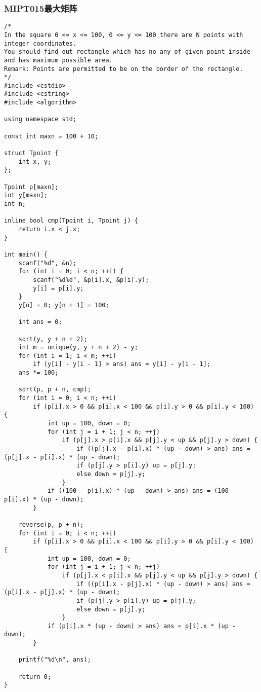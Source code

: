 \subsubsection{MIPT015最大矩阵}
\begin{verbatim}
/*
In the square 0 <= x <= 100, 0 <= y <= 100 there are N points with integer coordinates.
You should find out rectangle which has no any of given point inside and has maximum possible area.
Remark: Points are permitted to be on the border of the rectangle.
*/
#include <cstdio>
#include <cstring>
#include <algorithm>

using namespace std;

const int maxn = 100 + 10;

struct Tpoint {
	int x, y;
};

Tpoint p[maxn];
int y[maxn];
int n;

inline bool cmp(Tpoint i, Tpoint j) {
	return i.x < j.x;
}

int main() {
	scanf("%d", &n);
	for (int i = 0; i < n; ++i) {
		scanf("%d%d", &p[i].x, &p[i].y);
		y[i] = p[i].y;
	}
	y[n] = 0; y[n + 1] = 100;

	int ans = 0;

	sort(y, y + n + 2);
	int m = unique(y, y + n + 2) - y;
	for (int i = 1; i < m; ++i)
		if (y[i] - y[i - 1] > ans) ans = y[i] - y[i - 1];
	ans *= 100;

	sort(p, p + n, cmp);
	for (int i = 0; i < n; ++i)
		if (p[i].x > 0 && p[i].x < 100 && p[i].y > 0 && p[i].y < 100) {
			int up = 100, down = 0;
			for (int j = i + 1; j < n; ++j)
				if (p[j].x > p[i].x && p[j].y < up && p[j].y > down) {
					if ((p[j].x - p[i].x) * (up - down) > ans) ans = (p[j].x - p[i].x) * (up - down);
					if (p[j].y > p[i].y) up = p[j].y;
					else down = p[j].y;
				}
			if ((100 - p[i].x) * (up - down) > ans) ans = (100 - p[i].x) * (up - down);
		}

	reverse(p, p + n);
	for (int i = 0; i < n; ++i)
		if (p[i].x > 0 && p[i].x < 100 && p[i].y > 0 && p[i].y < 100) {
			int up = 100, down = 0;
			for (int j = i + 1; j < n; ++j)
				if (p[j].x < p[i].x && p[j].y < up && p[j].y > down) {
					if ((p[i].x - p[j].x) * (up - down) > ans) ans = (p[i].x - p[j].x) * (up - down);
					if (p[j].y > p[i].y) up = p[j].y;
					else down = p[j].y;
				}
			if (p[i].x * (up - down) > ans) ans = p[i].x * (up - down);
		}

	printf("%d\n", ans);

	return 0;
}
\end{verbatim}
